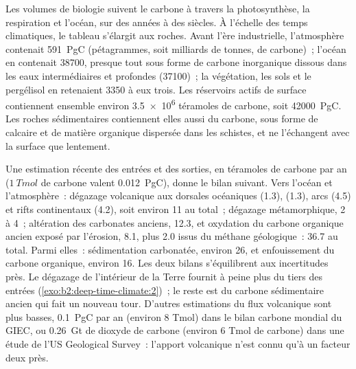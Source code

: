 Les volumes de biologie suivent le carbone à travers la photosynthèse, la respiration et l'océan, sur des années
à des siècles. À l'échelle des temps climatiques, le tableau s'élargit aux roches. Avant
l'ère industrielle, l'atmosphère contenait \qty{591}{PgC} (pétagrammes, soit milliards de tonnes, de carbone)~;
l'océan en contenait \num{38700}, presque tout sous forme de carbone inorganique dissous dans les eaux intermédiaires et
profondes (\num{37100})~; la végétation, les sols et le pergélisol en retenaient \num{3350} à eux trois. Les
réservoirs actifs de surface contiennent ensemble environ \num{3.5e6} téramoles de carbone, soit
\qty{42000}{PgC}. Les roches sédimentaires contiennent elles aussi du carbone, sous forme de calcaire et de matière
organique dispersée dans les schistes, et ne l'échangent avec la surface que lentement.

Une estimation récente des entrées et des sorties, en téramoles de carbone par an ($\qty{1}{Tmol}$ de
carbone valent \qty{0.012}{PgC}), donne le bilan suivant. Vers l'océan et l'atmosphère~: dégazage volcanique aux
dorsales océaniques (1.3),  (1.3), arcs (4.5) et rifts continentaux (4.2), soit environ 11 au
total~; dégazage métamorphique, 2 à 4~; altération des carbonates anciens, 12.3, et oxydation du carbone organique ancien
exposé par l'érosion, 8.1, plus 2.0 issus du méthane géologique~: \num{36.7} au total.
Parmi elles~: sédimentation carbonatée, environ 26, et enfouissement du carbone organique, environ 16. Les deux
bilans s'équilibrent aux incertitudes près. Le dégazage de l'intérieur de la Terre fournit à peine plus du
tiers des entrées (\cref{exo:b2:deep-time-climate:2})~; le reste est du carbone sédimentaire ancien qui fait
un nouveau tour. D'autres estimations du flux volcanique sont plus basses, \qty{0.1}{PgC} par an
(environ 8 Tmol) dans le bilan carbone mondial du GIEC, ou \qty{0.26}{Gt} de dioxyde de carbone (environ 6
Tmol de carbone) dans une étude de l'US Geological Survey~: l'apport volcanique n'est connu qu'à un
facteur deux près.

